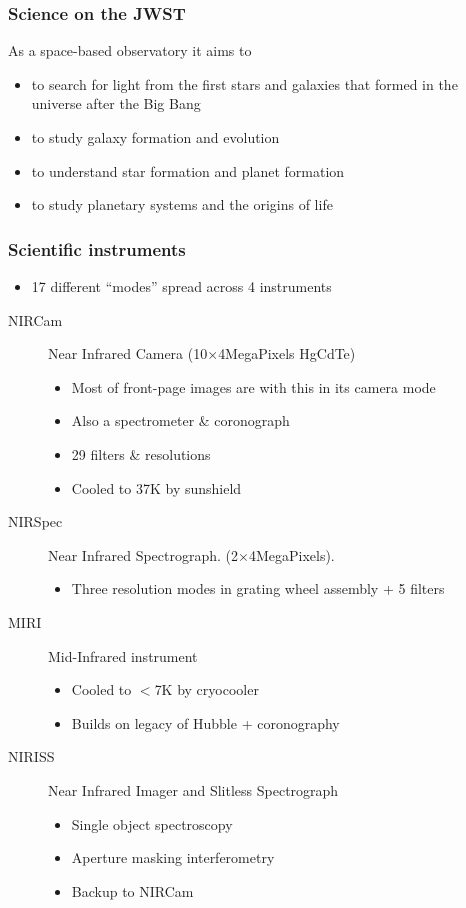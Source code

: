 \documentclass[aspectratio=169]{beamer}
\begin{document}
\begin{frame}
    \frametitle{Science on the JWST}
    As a space-based observatory it aims to
    \begin{itemize}
        \item to search for light from the first stars and galaxies that formed in the universe after the Big Bang
        \item to study galaxy formation and evolution
        \item to understand star formation and planet formation
        \item to study planetary systems and the origins of life
    \end{itemize}
\end{frame}

\begin{frame}
    \frametitle{Scientific instruments}
    \begin{itemize}
        \item 17 different ``modes'' spread across 4 instruments
    \end{itemize}
    \begin{description}
        \item[NIRCam] Near Infrared Camera (10$\times$4MegaPixels HgCdTe)
            \begin{itemize}
                \item Most of front-page images are with this in its camera mode
                \item Also a spectrometer \& coronograph
                \item 29 filters \& resolutions
                \item Cooled to 37K by sunshield
            \end{itemize}
        \item[NIRSpec] Near Infrared Spectrograph. (2$\times$4MegaPixels). \\
            \begin{itemize}
                \item Three resolution modes in grating wheel assembly + 5 filters
            \end{itemize}
        \item[MIRI] Mid-Infrared instrument
            \begin{itemize}
                \item Cooled to $<$7K by cryocooler
                \item Builds on legacy of Hubble + coronography
            \end{itemize}
        \item[NIRISS] Near Infrared Imager and Slitless Spectrograph
            \begin{itemize}
                \item Single object spectroscopy
                \item Aperture masking interferometry
                \item Backup to NIRCam
            \end{itemize}
    \end{description}
\end{frame}
\end{document}
